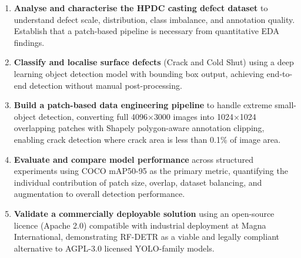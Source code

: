 \begin{enumerate}[leftmargin=2em]
    \item \textbf{Analyse and characterise the HPDC casting defect dataset} to understand defect scale, distribution, class imbalance, and annotation quality. Establish that a patch-based pipeline is necessary from quantitative EDA findings.

    \item \textbf{Classify and localise surface defects} (Crack and Cold Shut) using a deep learning object detection model with bounding box output, achieving end-to-end detection without manual post-processing.

    \item \textbf{Build a patch-based data engineering pipeline} to handle extreme small-object detection, converting full 4096$\times$3000 images into 1024$\times$1024 overlapping patches with Shapely polygon-aware annotation clipping, enabling crack detection where crack area is less than 0.1\% of image area.

    \item \textbf{Evaluate and compare model performance} across structured experiments using COCO mAP50-95 as the primary metric, quantifying the individual contribution of patch size, overlap, dataset balancing, and augmentation to overall detection performance.

    \item \textbf{Validate a commercially deployable solution} using an open-source licence (Apache 2.0) compatible with industrial deployment at Magna International, demonstrating RF-DETR as a viable and legally compliant alternative to AGPL-3.0 licensed YOLO-family models.
\end{enumerate}
